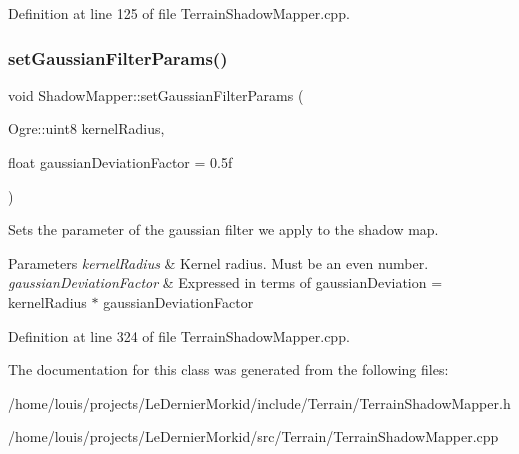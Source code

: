 Definition at line 125 of file Terrain\+Shadow\+Mapper.\+cpp.

\mbox{\label{class_shadow_mapper_a5438f906adc558347171a1d4fbbe616d}} 
\subsubsection{\texorpdfstring{set\+Gaussian\+Filter\+Params()}{setGaussianFilterParams()}}
{\footnotesize\ttfamily void Shadow\+Mapper\+::set\+Gaussian\+Filter\+Params (\begin{DoxyParamCaption}\item[{Ogre\+::uint8}]{kernel\+Radius,  }\item[{float}]{gaussian\+Deviation\+Factor = {\ttfamily 0.5f} }\end{DoxyParamCaption})}

Sets the parameter of the gaussian filter we apply to the shadow map. 
\begin{DoxyParams}{Parameters}
{\em kernel\+Radius} & Kernel radius. Must be an even number. \\
\hline
{\em gaussian\+Deviation\+Factor} & Expressed in terms of gaussian\+Deviation = kernel\+Radius $\ast$ gaussian\+Deviation\+Factor \\
\hline
\end{DoxyParams}


Definition at line 324 of file Terrain\+Shadow\+Mapper.\+cpp.



The documentation for this class was generated from the following files\+:\begin{DoxyCompactItemize}
\item 
/home/louis/projects/\+Le\+Dernier\+Morkid/include/\+Terrain/Terrain\+Shadow\+Mapper.\+h\item 
/home/louis/projects/\+Le\+Dernier\+Morkid/src/\+Terrain/Terrain\+Shadow\+Mapper.\+cpp\end{DoxyCompactItemize}
